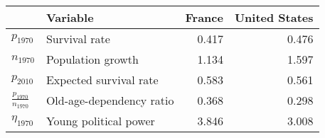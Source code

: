 
\begin{tabular}{llrr}
\toprule
\textbf{} & \textbf{Variable} & \textbf{France} & \textbf{United States}\\
\midrule
$p_{1970}$ & Survival rate & 0.417 & 0.476\\
$n_{1970}$ & Population growth & 1.134 & 1.597\\
$p_{2010}$ & Expected survival rate & 0.583 & 0.561\\
$\frac{p_{1970}}{n_{1970}}$ & Old-age-dependency ratio & 0.368 & 0.298\\
$\eta_{1970}$ & Young political power & 3.846 & 3.008\\
\bottomrule
\end{tabular}
